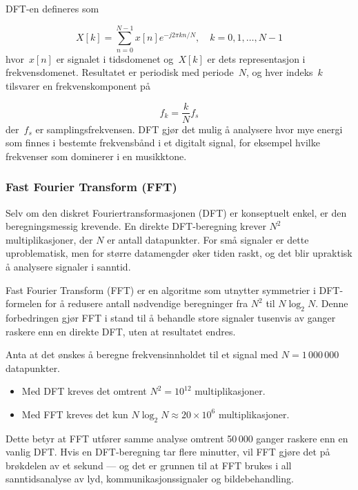 DFT-en defineres som

\begin{equation}
    X[k] = \sum_{n=0}^{N-1} x[n] e^{-j2\pi kn/N}, \quad k = 0, 1, \dots, N-1
\end{equation}
hvor~$x[n]$ er signalet i tidsdomenet og~$X[k]$ er dets representasjon i frekvensdomenet. Resultatet er periodisk med periode~$N$, og hver indeks~$k$ tilsvarer en frekvenskomponent på

\begin{equation}
    f_k = \frac{k}{N} f_s
\end{equation}
der~$f_s$ er samplingsfrekvensen. DFT gjør det mulig å analysere hvor mye energi som finnes i bestemte frekvensbånd i et digitalt signal, for eksempel hvilke frekvenser som dominerer i en musikktone.

\subsubsection{Fast Fourier Transform (FFT)}
Selv om den diskret Fouriertransformasjonen (DFT) er konseptuelt enkel, er den beregningsmessig krevende. 
En direkte DFT-beregning krever $N^2$ multiplikasjoner, der $N$ er antall datapunkter. 
For små signaler er dette uproblematisk, men for større datamengder øker tiden raskt, og det blir upraktisk å analysere signaler i sanntid. 

Fast Fourier Transform (FFT) er en algoritme som utnytter symmetrier i DFT-formelen for å redusere antall nødvendige beregninger fra $N^2$ til $N\log_2 N$. 
Denne forbedringen gjør FFT i stand til å behandle store signaler tusenvis av ganger raskere enn en direkte DFT, uten at resultatet endres.

Anta at det ønskes å beregne frekvensinnholdet til et signal med $N=1\,000\,000$ datapunkter.

\begin{itemize}
    \item Med DFT kreves det omtrent $N^2 = 10^{12}$ multiplikasjoner.
    \item Med FFT kreves det kun $N\log_2 N \approx 20 \times 10^6$ multiplikasjoner.
\end{itemize}

Dette betyr at FFT utfører samme analyse omtrent 50\,000 ganger raskere enn en vanlig DFT.  
Hvis en DFT-beregning tar flere minutter, vil FFT gjøre det på brøkdelen av et sekund — og det er grunnen til at 
FFT brukes i all sanntidsanalyse av lyd, kommunikasjonssignaler og bildebehandling.

